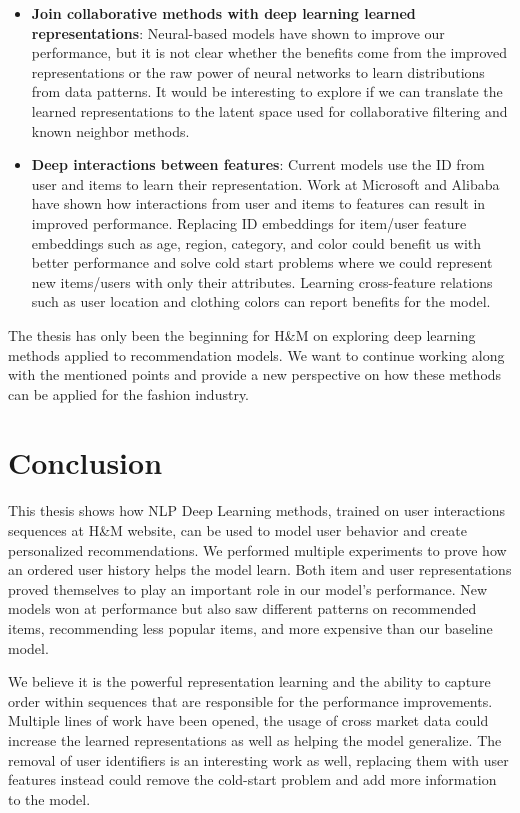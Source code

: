 \documentclass{kththesis}
\begin{document}
\begin{itemize}
    \item \textbf{Join collaborative methods with deep learning learned representations}: Neural-based models have shown to improve our performance, but it is not clear whether the benefits come from the improved representations or the raw power of neural networks to learn distributions from data patterns. It would be interesting to explore if we can translate the learned representations to the latent space used for collaborative filtering and known neighbor methods.
    
    \item \textbf{Deep interactions between features}: Current models use the ID from user and items to learn their representation. Work at Microsoft \cite{xDeepFM} and Alibaba \cite{alibaba} have shown how interactions from user and items to features can result in improved performance. Replacing ID embeddings for item/user feature embeddings such as age, region, category, and color could benefit us with better performance and solve cold start problems where we could represent new items/users with only their attributes. Learning cross-feature relations such as user location and clothing colors can report benefits for the model.
\end{itemize}

The thesis has only been the beginning for H\&M on exploring deep learning methods applied to recommendation models. We want to continue working along with the mentioned points and provide a new perspective on how these methods can be applied for the fashion industry. 

\newpage
\section{Conclusion}

This thesis shows how NLP Deep Learning methods, trained on user interactions sequences at H\&M website, can be used to model user behavior and create personalized recommendations. We performed multiple experiments to prove how an ordered user history helps the model learn. Both item and user representations proved themselves to play an important role in our model's performance. New models won at performance but also saw different patterns on recommended items, recommending less popular items, and more expensive than our baseline model.

We believe it is the powerful representation learning and the ability to capture order within sequences that are responsible for the performance improvements. Multiple lines of work have been opened, the usage of cross market data could increase the learned representations as well as helping the model generalize. The removal of user identifiers is an interesting work as well, replacing them with user features instead could remove the cold-start problem and add more information to the model.
\end{document}
